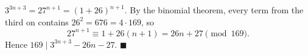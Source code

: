 $3^{3n+3}=27^{n+1}=(1+26)^{n+1}$. By the binomial theorem, every term from the third on contains $26^2=676=4\cdot169$, so
\[27^{n+1}\equiv1+26(n+1)=26n+27\pmod{169}.\]
Hence $169\mid3^{3n+3}-26n-27$. $\blacksquare$
